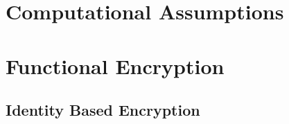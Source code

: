 








\maketitle

\ifTableOfContents 
	\tableofcontents
	\newpage
\fi

\chapter{Computational Assumptions}

\chapter{Functional Encryption}
	\section{Identity Based Encryption}
	





\appendix


